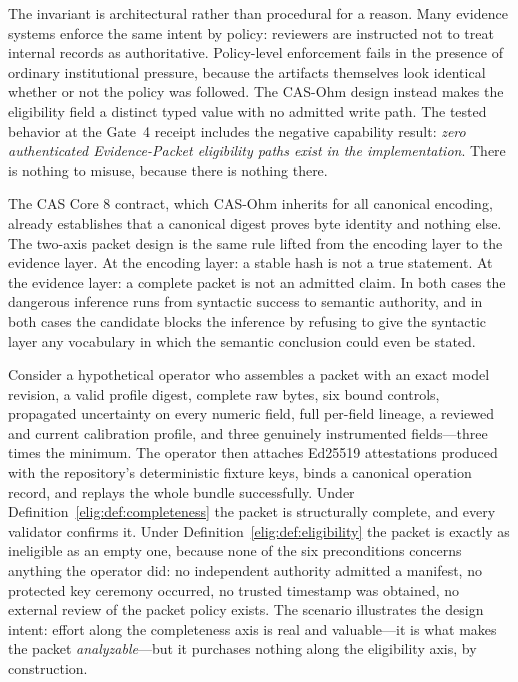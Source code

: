 The invariant is architectural rather than procedural for a reason. Many evidence systems enforce the same intent by policy: reviewers are instructed not to treat internal records as authoritative. Policy-level enforcement fails in the presence of ordinary institutional pressure, because the artifacts themselves look identical whether or not the policy was followed. The CAS-Ohm design instead makes the eligibility field a distinct typed value with no admitted write path. The tested behavior at the Gate~4 receipt includes the negative capability result: \emph{zero authenticated Evidence-Packet eligibility paths exist in the implementation}. There is nothing to misuse, because there is nothing there.

\begin{remark}\label{elig:rem:core8}
The CAS Core 8 contract, which CAS-Ohm inherits for all canonical encoding, already establishes that a canonical digest proves byte identity and nothing else. The two-axis packet design is the same rule lifted from the encoding layer to the evidence layer. At the encoding layer: a stable hash is not a true statement. At the evidence layer: a complete packet is not an admitted claim. In both cases the dangerous inference runs from syntactic success to semantic authority, and in both cases the candidate blocks the inference by refusing to give the syntactic layer any vocabulary in which the semantic conclusion could even be stated.
\end{remark}

\begin{example}\label{elig:ex:accumulation}
Consider a hypothetical operator who assembles a packet with an exact model revision, a valid profile digest, complete raw bytes, six bound controls, propagated uncertainty on every numeric field, full per-field lineage, a reviewed and current calibration profile, and three genuinely instrumented fields---three times the minimum. The operator then attaches Ed25519 attestations produced with the repository's deterministic fixture keys, binds a canonical operation record, and replays the whole bundle successfully. Under Definition~\ref{elig:def:completeness} the packet is structurally complete, and every validator confirms it. Under Definition~\ref{elig:def:eligibility} the packet is exactly as ineligible as an empty one, because none of the six preconditions concerns anything the operator did: no independent authority admitted a manifest, no protected key ceremony occurred, no trusted timestamp was obtained, no external review of the packet policy exists. The scenario illustrates the design intent: effort along the completeness axis is real and valuable---it is what makes the packet \emph{analyzable}---but it purchases nothing along the eligibility axis, by construction.
\end{example}

